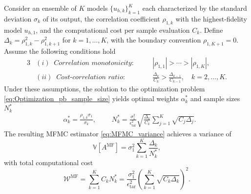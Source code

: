 %
\begin{theorem}
\label{thm:Sample_size_est}
Consider an ensemble of $K$ models $\{u_{h,k}\}_{k=1}^K$ each characterized by the standard deviation $\sigma_k$ of its output, the correlation coefficient $\rho_{1,k}$ with the highest-fidelity model $u_{h,1}$, and the computational cost per sample evaluation $C_k$. Define $\Delta_k = \rho_{1,k}^2 - \rho_{1,k+1}^2$ for $k = 1, \dots, K$, with the boundary convention $\rho_{1,K+1} = 0$. Assume the following conditions hold
%
\begin{alignat*}{3}
&(i)\;\; \textit{Correlation monotonicity}: \quad && |\rho_{1,1}| > \cdots > |\rho_{1,K}|, \\ 
&(ii)\;\; \textit{Cost-correlation ratio}: \quad && \frac{\Delta_k}{C_k} > \frac{\Delta_{k-1}}{C_{k-1}}, \quad k=2,\ldots,K. 
\end{alignat*}
%
Under these assumptions, the solution to the optimization problem \eqref{eq:Optimization_pb_sample_size} yields optimal weights $\alpha_k^*$ and sample sizes $N_k^*$
%
\begin{align}
    \label{eq:MFMC_SampleSize}
    &\alpha_k^*=\frac{\rho_{1,k}\sigma_1}{\sigma_k},\qquad \;N_k^*=\frac{\sigma_1^2}{\epsilon_\text{tar}^2}\sqrt{\frac{\Delta_k}{C_k}}\sum_{j=1}^K\sqrt{C_j\Delta_{j}}.
\end{align}
%
The resulting MFMC estimator \eqref{eq:MFMC_variance} achieves a variance of
%
\begin{equation}
\label{eq:MFMC_variance_optimal}
\mathbb{V}\left[A^{\text{MF}}\right] =
\sigma_1^2\sum_{k=1}^K\frac{\Delta_k}{N_k^*},
\end{equation}
%
with total computational cost
%
\begin{equation}\label{eq:MFMC_sampling_cost}
    \mathcal{W}^\text{MF} = \sum_{k=1}^K C_k N_k^* = \frac{\sigma_1^2}{\epsilon_{\text{tar}}^2}\left(\sum_{k=1}^K\sqrt{C_k\Delta_k}\right)^2.
\end{equation}
%
\end{theorem}

